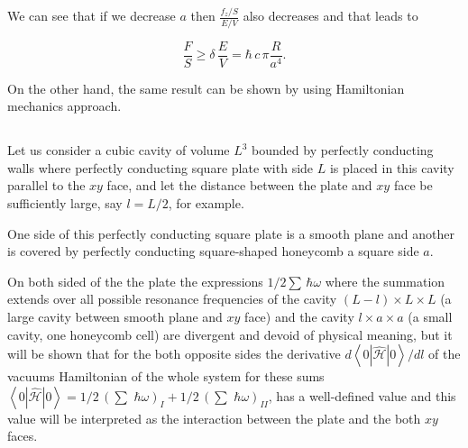 \documentclass[twoside, 10pt]{article}
\def\myvspacebeforesubsection{-2.0mm}
\def\myvspaceaftersubsection{-2.5mm}
\begin{document}
\begin{multicols}{2}
We can see that if we decrease \(a\) then \(\frac{f_z/S}{E/V}\) also decreases
and that leads to

\begin{equation}\frac{F}{S} \geq \delta\,\frac{E}{V} = \hbar\,c\, \pi\frac{R}{a^4}.\end{equation}

On the other hand, the same result can be shown by using
Hamiltonian mechanics approach.


\vspace{\myvspacebeforesubsection}
    \subsection*{} \label{appendix-c.-hamiltonian-mechanics-approach}
\vspace{\myvspaceaftersubsection}


\setcounter{equation}{0}
\renewcommand{\theequation}{C.\arabic{equation}}

    Let us consider a cubic cavity of volume \(L^3\) bounded by perfectly
conducting walls where perfectly conducting square plate with side
\(L\) is placed in this cavity parallel to the \(xy\) face, and let the distance
between the plate and \(xy\) face be sufficiently large, say \(l = L/2\), for example.

One side of this perfectly conducting square plate is a smooth plane and
another is covered by perfectly conducting square-shaped honeycomb a square side \(a\).

On both sided of the the plate the expressions \(1\big/2\sum\,\hbar\omega\)
where the summation extends over all possible resonance frequencies of
the cavity \(\left(L-l\right)\times L\times L\) (a large cavity between
smooth plane and \(xy\) face) and the cavity \(l\times a\times a\) (a small
cavity, one honeycomb cell) are divergent and devoid of physical meaning,
but it will be shown that for the both
opposite sides the derivative \({d\left<0|\hat{\mathcal{H}}|0\right>}\big/{dl}\) of
the vacuums Hamiltonian of the whole system for these sums
\(\left<0|\hat{\mathcal{H}}|0\right> = 1\big/2\,\left(\sum\,\,\hbar\omega\right)_{I} + 1\big/2\,\left(\sum\,\,\hbar\omega\right)_{II}\),
has a well-defined value and this value will be
interpreted as the interaction between the plate and the both \(xy\) faces.


\end{multicols}
\end{document}
